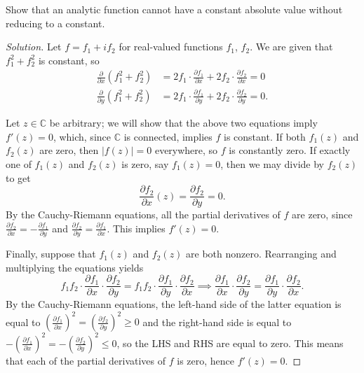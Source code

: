 \documentclass[10pt]{article}
\providecommand{\CC}{\mathbb C}
\newenvironment{soln}{\begin{proof}[Solution]}{\end{proof}}
\providecommand{\abs}[1]{\left\lvert #1\right\rvert}
\begin{document}
\begin{problem}
    [p.28\#4]
    Show that an analytic function cannot have a constant absolute value
    without reducing to a constant.
\end{problem}

\begin{soln}
    Let $f = f_1 + if_2$ for real-valued functions $f_1$, $f_2$.
    We are given that $f_1^2 + f_2^2$ is constant, so
    \begin{align*}
	\frac\partial{\partial x}(f_1^2 + f_2^2)
	&= 2f_1\cdot\frac{\partial f_1}{\partial x}
	+ 2f_2\cdot\frac{\partial f_2}{\partial x} = 0\\
	\frac\partial{\partial y}(f_1^2 + f_2^2)
	&= 2f_1\cdot\frac{\partial f_1}{\partial y}
	+ 2f_2\cdot\frac{\partial f_2}{\partial y} = 0.
    \end{align*}

    Let $z\in\CC$ be arbitrary; we will show that
    the above two equations imply $f'(z) = 0$,
    which, since $\CC$ is connected, implies $f$ is constant.
    If both $f_1(z)$ and $f_2(z)$ are zero,
    then $\abs{f(z)} = 0$ everywhere, so $f$ is constantly zero.
    If exactly one of $f_1(z)$ and $f_2(z)$ is zero, say $f_1(z) = 0$,
    then we may divide by $f_2(z)$ to get
    \begin{equation*}
	\frac{\partial f_2}{\partial x}(z)
	= \frac{\partial f_2}{\partial y} = 0.
    \end{equation*}
    By the Cauchy-Riemann equations,
    all the partial derivatives of $f$ are zero, since
    $\frac{\partial f_2}{\partial x} = -\frac{\partial f_1}{\partial y}$
    and $\frac{\partial f_2}{\partial y} = \frac{\partial f_1}{\partial x}$.
    This implies $f'(z) = 0$.

    Finally, suppose that $f_1(z)$ and $f_2(z)$ are both nonzero.
    Rearranging and multiplying the equations yields
    \begin{equation*}
	f_1f_2\cdot
	\frac{\partial f_1}{\partial x}\cdot\frac{\partial f_2}{\partial y} =
	f_1f_2\cdot
	\frac{\partial f_1}{\partial y}\cdot\frac{\partial f_2}{\partial x}
	\implies
	\frac{\partial f_1}{\partial x}\cdot\frac{\partial f_2}{\partial y} =
	\frac{\partial f_1}{\partial y}\cdot\frac{\partial f_2}{\partial x}.
    \end{equation*}
    By the Cauchy-Riemann equations, the left-hand side
    of the latter equation is equal to
    $(\frac{\partial f_1}{\partial x})^2
    = (\frac{\partial f_2}{\partial y})^2 \ge 0$
    and the right-hand side is equal to
    $-(\frac{\partial f_1}{\partial x})^2
    = -(\frac{\partial f_2}{\partial y})^2\le 0$,
    so the LHS and RHS are equal to zero.
    This means that each of the partial derivatives of $f$ is zero,
    hence $f'(z) = 0$.
\end{soln}
\end{document}
